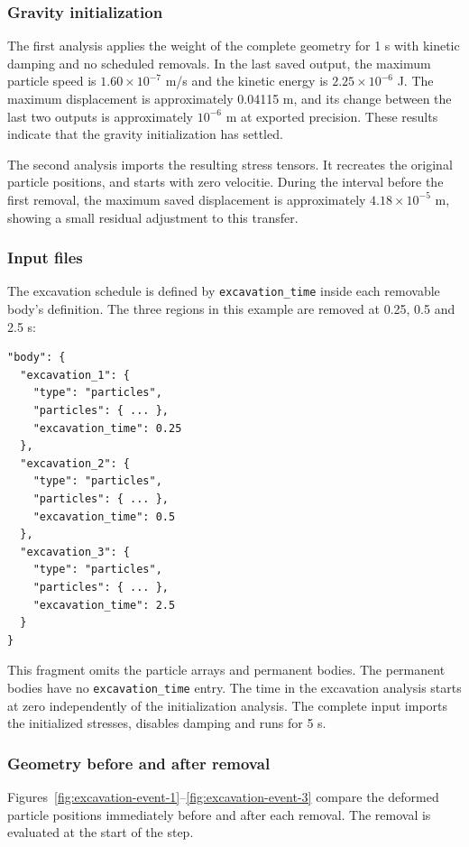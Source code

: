 \subsubsection*{Gravity initialization}

The first analysis applies the weight of the complete geometry for 1 s with kinetic damping and no scheduled removals. In the last saved output, the maximum particle speed is $1.60\times10^{-7}$ m/s and the kinetic energy is $2.25\times10^{-6}$ J. The maximum displacement is approximately 0.04115 m, and its change between the last two outputs is approximately $10^{-6}$ m at exported precision. These results indicate that the gravity initialization has settled.

The second analysis imports the resulting stress tensors. It recreates the original particle positions, and starts with zero velocitie. During the interval before the first removal, the maximum saved displacement is approximately $4.18\times10^{-5}$ m, showing a small residual adjustment to this transfer.

\subsubsection*{Input files}

The excavation schedule is defined by \texttt{excavation\_time} inside each removable body's definition. The three regions in this example are removed at 0.25, 0.5 and 2.5 s:
\begin{lstlisting}
"body": {
  "excavation_1": {
    "type": "particles",
    "particles": { ... },
    "excavation_time": 0.25
  },
  "excavation_2": {
    "type": "particles",
    "particles": { ... },
    "excavation_time": 0.5
  },
  "excavation_3": {
    "type": "particles",
    "particles": { ... },
    "excavation_time": 2.5
  }
}
\end{lstlisting}
This fragment omits the particle arrays and permanent bodies. The permanent bodies have no \texttt{excavation\_time} entry. The time in the excavation analysis starts at zero independently of the initialization analysis. The complete input imports the initialized stresses, disables damping and runs for 5 s.

\subsubsection*{Geometry before and after removal}

Figures~\ref{fig:excavation-event-1}--\ref{fig:excavation-event-3} compare the deformed particle positions immediately before and after each removal. The removal is evaluated at the start of the step. 


